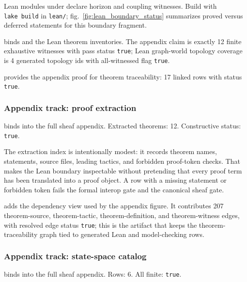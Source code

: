 \documentclass[
  english,
]{article}
\begin{document}
Lean modules under  declare
horizon and coupling witnesses. Build with \texttt{lake\ build} in
\texttt{lean/}; fig.~\ref{fig:lean_boundary_status} summarizes proved
versus deferred statements for this boundary fragment.

 binds
 and the Lean
theorem inventories. The appendix claim is exactly 12 finite exhaustive
witnesses with pass status \texttt{true}; Lean graph-world topology
coverage is 4 generated topology ids with all-witnessed flag
\texttt{true}.

 provides the appendix proof
for theorem traceability: 17 linked rows with status \texttt{true}.

\subsubsection{Appendix track: proof
extraction}\label{appendix-track-proof-extraction}

 binds
 into the full sheaf
appendix. Extracted theorems: 12. Constructive status: \texttt{true}.

The extraction index is intentionally modest: it records theorem names,
statements, source files, leading tactics, and forbidden proof-token
checks. That makes the Lean boundary inspectable without pretending that
every proof term has been translated into a proof object. A row with a
missing statement or forbidden token fails the formal interop gate and
the canonical sheaf gate.

 adds the dependency
view used by the appendix figure. It contributes 207 theorem-source,
theorem-tactic, theorem-definition, and theorem-witness edges, with
resolved edge status \texttt{true}; this is the artifact that keeps the
theorem-traceability graph tied to generated Lean and model-checking
rows.

\subsubsection{Appendix track: state-space
catalog}\label{appendix-track-state-space-catalog}

 binds
 into the full sheaf
appendix. Rows: 6. All finite: \texttt{true}.
\end{document}
